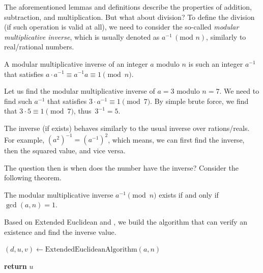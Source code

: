 \documentclass[../lecture-notes-148x210.tex]{subfiles}
\begin{document}
The aforementioned lemmas and definitions describe the properties of addition, subtraction, and multiplication. But what about division? To define the division (if such operation is valid at all), we need to consider the so-called \emph{modular multiplicative inverse}, which is usually denoted as $a^{-1} \, (\text{mod } n)$, similarly to real/rational numbers.

\begin{definition}
    A modular multiplicative inverse of an integer $a$ modulo $n$ is such an integer $a^{-1}$ that satisfies $a \cdot a^{-1} \equiv a^{-1}a \equiv 1 \pmod{n}$.
\end{definition}

\begin{example}
    Let us find the modular multiplicative inverse of $a = 3$ modulo $n = 7$.
    We need to find such $a^{-1}$ that satisfies $3 \cdot a^{-1} \equiv 1 \pmod{7}$.
    By simple brute force, we find that $3 \cdot 5 \equiv 1 \pmod{7}$, thus~$3^{-1} = 5$.
\end{example}

\begin{remark}
    The inverse (if exists) behaves similarly to the usual inverse over rations/reals. For example, $(a^{2})^{-1} = (a^{-1})^{2}$, which means, we can first find the inverse, then the squared value, and vice versa.
\end{remark}

The question then is when does the number have the inverse? Consider the following theorem.

\begin{theorem}\label{th:inverse_existence}
    The modular multiplicative inverse $a^{-1} \pmod{n}$ exists if and only if $\gcd(a, n) = 1$.
\end{theorem}

Based on Extended Euclidean  and , we build the algorithm that can verify an existence and find the inverse value.

\begin{algorithm}[H]
    \caption{Modular multiplicative inverse algorithm} \label{alg:modular_inverse}
        
    $(d, u, v) \gets \text{ExtendedEuclideanAlgorithm}(a, n)$ 


    \textbf{return} $u$
\end{algorithm}
\end{document}
